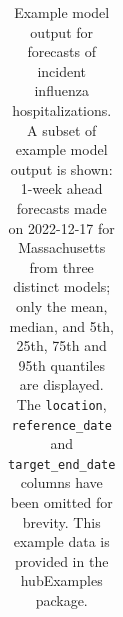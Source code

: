 \documentclass[
  letterpaper,
  DIV=11,
  numbers=noendperiod]{scrartcl}
\begin{document}
\begin{longtable}[]{@{}
  >{\raggedright\arraybackslash}p{}
  >{\raggedright\arraybackslash}p{}
  >{\raggedleft\arraybackslash}p{}
  >{\raggedright\arraybackslash}p{}
  >{\raggedright\arraybackslash}p{}
  >{\raggedleft\arraybackslash}p{}@{}}

\caption{\label{tbl-example-model-outputs}Example model output for
forecasts of incident influenza hospitalizations. A subset of example
model output is shown: 1-week ahead forecasts made on 2022-12-17 for
Massachusetts from three distinct models; only the mean, median, and
5th, 25th, 75th and 95th quantiles are displayed. The \texttt{location},
\texttt{reference\_date} and \texttt{target\_end\_date} columns have
been omitted for brevity. This example data is provided in the
{hubExamples} package.}

\tabularnewline


\end{longtable}
\end{document}
